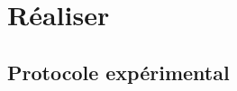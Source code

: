 \documentclass[../main/main.tex]{subfiles}
\begin{document}
\section{Réaliser}


\subsection{Protocole expérimental}
\end{document}
